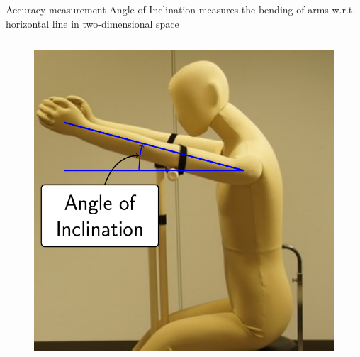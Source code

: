 \documentclass[aspectratio=43,11pt,xcolor={dvipsnames}]{beamer}
\begin{document}
\begin{frame}{Accuracy measurement}
	Angle of Inclination measures the bending of arms w.r.t. horizontal line in two-dimensional space
	\begin{columns}[t]
		\begin{column}{0.4\textwidth}
			\begin{figure}
				\includegraphics[width=\textwidth]{inclination_plus}
			\end{figure}
		\end{column}
								

\end{columns}
\end{frame}
\end{document}
